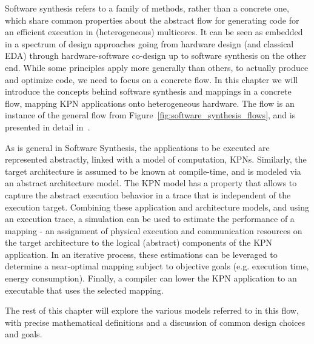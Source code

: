 %

Software synthesis refers to a family of methods, rather than a concrete one, which share common properties about the abstract flow for generating code for an efficient execution in (heterogeneous) multicores.
It can be seen as embedded in a spectrum of design approaches going from hardware design (and classical \ac{EDA}) through hardware-software co-design up to software synthesis on the other end. 
While some principles apply more generally than others, to actually produce and optimize code, we need to focus on a concrete flow.
In this chapter we will introduce the concepts behind software synthesis and mappings in a concrete flow, mapping KPN applications onto heterogeneous hardware.
The flow is an instance of the general flow from Figure~\ref{fig:software_synthesis_flows}, and is presented in detail in~\cite{castrillon2014thesis}. 


As is general in Software Synthesis, the applications to be executed are represented abstractly, linked with a model of computation, \acfp{KPN}.
Similarly, the target architecture is assumed to be known at compile-time, and is modeled via an abstract architecture model.
The \ac{KPN} model has a property that allows to capture the abstract execution behavior in a trace that is independent of the execution target.
Combining these application and architecture models, and using an execution trace, a simulation can be used to estimate the performance of a mapping - an assignment of physical execution and communication resources on the target architecture to the logical (abstract) components of the \ac{KPN} application.
In an iterative process, these estimations can be leveraged to determine a near-optimal mapping subject to objective goals (e.g. execution time, energy consumption).
Finally, a compiler can lower the KPN application to an executable that uses the selected mapping.

The rest of this chapter will explore the various models referred to in this flow, with precise mathematical definitions and a discussion of common design choices and goals.